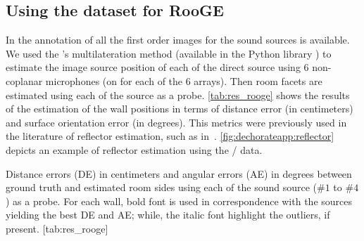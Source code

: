 \subsection{Using the \dEchorate{} dataset for \acs{RooGE}}\label{subsec:dechorateapp:rooge}
In \dEchorate{} the annotation of all the first order images for the sound sources is available.
We used the \citeauthor{Beck2008ExactProblems}'s multilateration method (available in the Python library \dEchorate) to estimate the image source position of each of the direct source using 6 non-coplanar microphones (on for each of the 6 arrays).
Then room facets are estimated using each of the source as a probe.
\cref{tab:res_rooge} shows the results of the estimation of the wall positions in terms of distance error (in centimeters) and surface orientation error (in degrees).
This metrics were previously used in the literature of reflector estimation, such as in~.
\cref{fig:dechorateapp:reflector} depicts an example of reflector estimation using the \DECHORATE/ data.

\begin{table}[h!]
    \begin{sidecaption}[]{
        Distance errors (DE) in centimeters and angular errors (AE) in degrees between ground truth and estimated room sides using each of the sound source ($\#1$ to $\#4$) as a probe. For each wall, bold font is used in correspondence with the sources yielding the best DE and AE; while, the italic font highlight the outliers, if present.
        }[tab:res_rooge]
    \centering
    \small
    
    \end{sidecaption}
\end{table}


